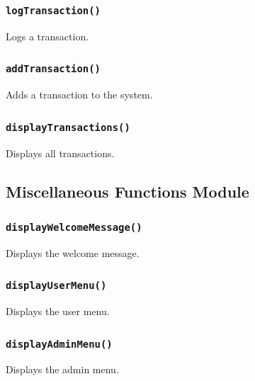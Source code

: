 \documentclass[12pt,a4paper]{report}
\begin{document}
\subsubsection{\texttt{logTransaction()}}
Logs a transaction.


\subsubsection{\texttt{addTransaction()}}
Adds a transaction to the system.


\subsubsection{\texttt{displayTransactions()}}
Displays all transactions.


\subsection{Miscellaneous Functions Module}
\subsubsection{\texttt{displayWelcomeMessage()}}
Displays the welcome message.


\subsubsection{\texttt{displayUserMenu()}}
Displays the user menu.


\subsubsection{\texttt{displayAdminMenu()}}
Displays the admin menu.

\end{document}
